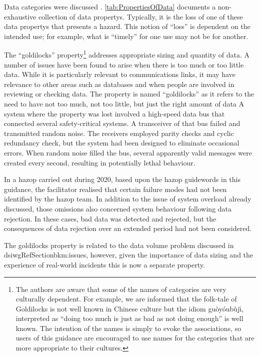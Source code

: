 Data categories were discussed . \autoref{tab:PropertiesOfData} documents a non-exhaustive collection of \glspl{data property}. Typically, it is the loss of one of these \glspl{data property} that presents a \gls{hazard}. This notion of ``loss'' is dependent on the intended use; for example, what is ``timely'' for one use may not be for another.

The ``\Gls{goldilocks}'' property\footnote{The authors are aware that some of the names of categories are very culturally dependent. For example, we are informed that the folk-tale of Goldilocks is not well known in Chinese culture but the idiom gu\`oy\'oub\`uj\'\i, interpreted as ``doing too much is just as bad as not doing enough'' is well known. The intention of the names is simply to evoke the associations, so users of this guidance are encouraged to use names for the categories that are more appropriate to their cultures.} addresses appropriate sizing and quantity of data. A number of issues have been found to arise when there is too much or too little data. While it is particularly relevant to communications links, it may have relevance to other areas such as \glspl{database} and when people are involved in reviewing or checking data. The property is named ``\gls{goldilocks}'' as it refers to the need to have not too much, not too little, but just the right amount of data%
%
A system where the property was lost involved a high-speed data bus that connected several safety-critical systems. A transceiver of that bus failed and transmitted random noise. The receivers employed parity checks and cyclic redundancy check, but the system had been designed to eliminate occasional \glspl{error}. When random noise filled the bus, several apparently valid messages were created every second, resulting in potentially lethal behaviour.
	
	In a \gls{hazop} carried out during 2020, based upon the \gls{hazop} guidewords in this guidance, the facilitator realised that certain failure modes had not been identified by the \gls{hazop} team. In addition to the issue of system overload already discussed, those omissions also concerned system behaviour following data rejection. In these cases, bad data was detected and rejected, but the consequences of data rejection over an extended period had not been considered.

The \gls{goldilocks} property is related to the data volume problem discussed in dsiwgRef{Section}{bkm:issues}, however, given the importance of data sizing and the experience of real-world incidents this is now a separate property.

